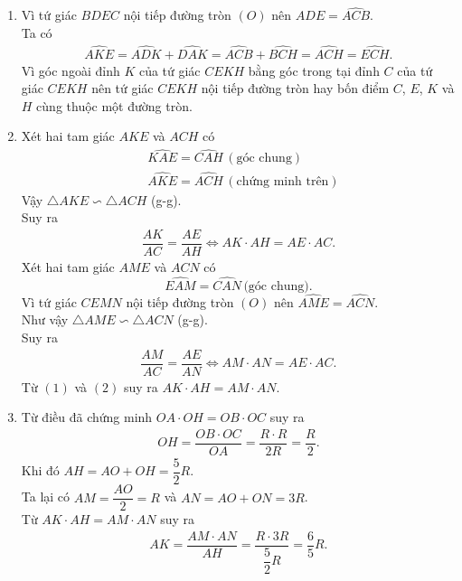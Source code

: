 \begin{ex}
{\begin{enumerate}
\begin{align*}
   \end{align*}
   \item Vì tứ giác $BDEC$ nội tiếp đường tròn $(O)$ nên $\widehat{ADE} = \widehat{ACB}$.\\
   Ta có
   \begin{align*}
    \widehat{AKE} = \widehat{ADK} + \widehat{DAK} = \widehat{ACB} + \widehat{BCH} = \widehat{ACH} = \widehat{ECH}.
   \end{align*}
   Vì góc ngoài đỉnh $K$ của tứ giác $CEKH$ bằng góc trong tại đỉnh $C$ của tứ giác $CEKH$ nên tứ giác $CEKH$ nội tiếp đường tròn hay bốn điểm $C$, $E$, $K$ và $H$ cùng thuộc một đường tròn.
   \item Xét hai tam giác $AKE$ và $ACH$ có 
   \begin{align*}
    & \widehat{KAE} = \widehat{CAH} \, (\text{góc chung})\\
    & \widehat{AKE} = \widehat{ACH} \, (\text{chứng minh trên})
   \end{align*}
   Vậy $\triangle AKE \backsim \triangle ACH$ (g-g).\\
   Suy ra
   \begin{align*}
    \dfrac{AK}{AC} = \dfrac{AE}{AH} \Leftrightarrow AK \cdot AH = AE \cdot AC.\tag{1}
   \end{align*}
   Xét hai tam giác $AME$ và $ACN$ có
   $$\widehat{EAM} = \widehat{CAN} \, \text{(góc chung)}.$$
   Vì tứ giác $CEMN$ nội tiếp đường tròn $(O)$ nên $\widehat{AME} = \widehat{ACN}$.\\
   Như vậy $\triangle AME \backsim \triangle ACN$ (g-g).\\
   Suy ra
   \begin{align*}
    \dfrac{AM}{AC} = \dfrac{AE}{AN} \Leftrightarrow AM \cdot AN = AE \cdot AC.\tag{2}
   \end{align*}
   Từ $(1)$ và $(2)$ suy ra $AK \cdot AH = AM \cdot AN$.
   \item Từ điều đã chứng minh $OA \cdot OH = OB \cdot OC$ suy ra
   \begin{align*}
    OH = \dfrac{OB \cdot OC}{OA} = \dfrac{R \cdot R}{2R} = \dfrac{R}{2}.
   \end{align*}
   Khi đó $AH = AO + OH = \dfrac{5}{2}R$.\\
   Ta lại có $AM = \dfrac{AO}{2} = R$ và $AN = AO+ON = 3R$.\\
   Từ $AK \cdot AH = AM \cdot AN$ suy ra
   \begin{align*}
    AK = \dfrac{AM \cdot AN}{AH} = \dfrac{R \cdot 3R}{\dfrac{5}{2}R} = \dfrac{6}{5}R.
   \end{align*}
  \end{enumerate}
  }
\end{ex}
